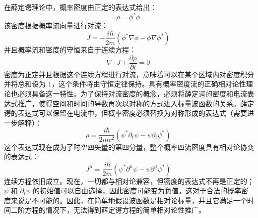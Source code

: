 在薛定谔理论中，概率密度由正定的表达式给出：
\[
\rho = \phi^* \phi~
\]
该密度根据概率流向量进行对流：
\[
J = - \frac{i \hbar}{2m} (\phi^* \nabla \phi - \phi \nabla \phi^*)~
\]
并且概率流和密度的守恒来自于连续方程：
\[
\nabla \cdot J + \frac{\partial \rho}{\partial t} = 0~
\]
密度为正定并且根据这个连续方程进行对流，意味着可以在某个区域内对密度积分并将总和设为 1，这个条件将由守恒定律保持。具有概率密度流的正确相对论性理论也必须具备这一特性。为了保持对流密度的概念，必须将薛定谔的密度和电流表达式推广，使得空间和时间的导数再次以对称的方式进入标量波函数的关系。薛定谔的表达式可以保留在电流中，但概率密度必须替换为对称形成的表达式（需要进一步解释）：
\[
\rho = \frac{i \hbar}{2m c^2} \left( \psi^* \partial_t \psi - \psi \partial_t \psi^* \right)~
\]
这个表达式现在成为了时空四矢量的第四分量，整个概率四流密度具有相对论协变的表达式：
\[
J^\mu = \frac{i \hbar}{2m} \left( \psi^* \partial^\mu \psi - \psi \partial^\mu \psi^* \right)~
\]
连续方程依旧成立。现在，一切都与相对论兼容，但密度的表达式不再是正定的；\(\psi\) 和 \(\partial_t \psi\) 的初始值可以自由选择，因此密度可能变为负值，这对于合法的概率密度来说是不可能的。因此，在简单地假设波函数是相对论标量，并且它满足一个时间二阶方程的情况下，无法得到薛定谔方程的简单相对论性推广。


